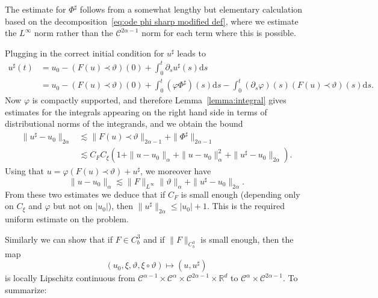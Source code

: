 \documentclass[a4paper,11pt]{article}
\newcommand{\mathd}{\mathrm{d}}
\theoremstyle{remark}
\newcommand{\CC}{\ensuremath{\mathscr{C}}}
\newcommand{\lpara}{\,\mathord{\prec}\,}
\newcommand{\reso}{\,\mathord{\circ}\,}
\begin{document}
The estimate for $\Phi^{\sharp}$ follows from a somewhat lengthy but
elementary calculation based on the decomposition~\eqref{eq:ode phi sharp modified def}, where we estimate the $L^{\infty}$ norm rather than the
$\CC^{2 \alpha -1}$ norm for each term where this is possible.

Plugging in the correct initial condition for $u^{\sharp}$ leads to
\begin{align*}
   u^{\sharp} ( t ) &= u_{0} - ( F ( u ) \lpara \vartheta ) ( 0 ) + \int_{0}^{t}\partial_{s} u^{\sharp} ( s ) \mathd s \\
   & =u_{0} - ( F ( u ) \lpara \vartheta ) ( 0 ) + \int_{0}^{t} (\varphi \Phi^{\sharp}) ( s ) \mathd s- \int_{0}^{t} ( \partial_{s} \varphi ) ( s )  ( F ( u ) \lpara \vartheta ) ( s ) \mathd s.
\end{align*}
Now $\varphi$ is compactly supported, and therefore Lemma~\ref{lemma:integral} gives estimates for the integrals appearing on
the right hand side in terms of distributional norms of the integrands, and we
obtain the bound
\begin{align*}
   \| u^{\sharp} -u_{0} \|_{2 \alpha} & \lesssim \| F ( u ) \lpara \vartheta \|_{2 \alpha -1} + \| \Phi^{\sharp} \|_{2 \alpha -1} \\
   & \lesssim C_{F} C_{\xi} ( 1+ \| u-u_{0} \|_{\alpha} + \| u-u_{0} \|^{2}_{\alpha} + \| u^{\sharp} -u_{0} \|_{2 \alpha} ).
\end{align*}
Using that $u= \varphi (F ( u ) \lpara \vartheta ) +u^{\sharp}$, we moreover have
\[
   \| u-u_{0} \|_{\alpha} \lesssim  \| F \|_{L^{\infty}} \| \vartheta \|_{\alpha} + \| u^{\sharp} -u_{0} \|_{2 \alpha}.
\]
From these two estimates we deduce that if $C_{F}$ is small enough (depending only on $C_{\xi}$ and $\varphi$ but not on $| u_{0} |$), then $\| u^{\sharp} \|_{2 \alpha} \leqslant | u_{0} | +1$. 
This is the required uniform estimate on the problem.



Similarly we can show that if $F \in C^{3}_{b}$ and if $\| F \|_{C^{3}_{b}}$
is small enough, then the map
\[
   (u_0, \xi , \vartheta , \xi \reso   \vartheta) \mapsto ( u,u^{\sharp} )
\]
is locally Lipschitz continuous from $\CC^{\alpha -1} \times \CC^{\alpha}\times \CC^{2 \alpha -1} \times \mathbb{R}^{d}$ to $\CC^{\alpha} \times \CC^{2 \alpha -1}$. To summarize:
\end{document}
